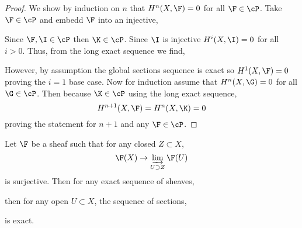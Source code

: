\documentclass[12pt]{article}
\begin{document}
\begin{proof}
We show by induction on $n$ that $H^n(X, \F) = 0$ for all $\F \in \cP$. Take $\F \in \cP$ and embedd $\F$ into an injective,
\begin{center}
\end{center}
Since $\F, \I \in \cP$ then $\K \in \cP$. Since $\I$ is injective $H^i(X, \I) = 0$ for all $i > 0$. Thus, from the long exact sequence we find,
\begin{center}
\end{center} 
\begin{center}
\end{center} 
However, by assumption the global sections sequence is exact so $H^1(X, \F) = 0$ proving the $i = 1$ base case. Now for induction assume that $H^n(X, \G) = 0$ for all $\G \in \cP$. Then  because $\K \in \cP$ using the long exact sequence,
\[ H^{n+1}(X, \F) = H^n(X, \K) = 0 \]
proving the statement for $n + 1$ and any $\F \in \cP$. 
\end{proof}

\begin{lemma}
Let $\F$ be a sheaf such that for any closed $Z \subset X$,
\[ \F(X) \to \varinjlim_{U \supset Z} \F(U) \]
is surjective. Then for any exact sequence of sheaves,
\begin{center}
\end{center}
then for any open $U \subset X$, the sequence of sections,
\begin{center}
\end{center}
is exact.
\end{lemma}
\end{document}
